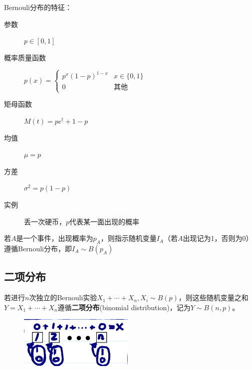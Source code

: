 Bernouli分布的特征：
\begin{description}
    \item[参数] $p \in [0,1]$
    \item[概率质量函数] $p(x)=\begin{cases}
                p^x (1-p)^{1-x} & x \in \{0,1 \} \\
                0               & \text{其他}
            \end{cases}$
    \item[矩母函数] $M(t)=p e^t + 1-p$
    \item[均值] $\mu=p$
    \item[方差] $\sigma^2=p(1-p)$
    \item[实例] 丢一次硬币，$p$代表某一面出现的概率
\end{description}

\begin{remark}
    若$A$是一个事件，出现概率为$p_A$，则指示随机变量$I_A$（若$A$出现记为1，否则为0）遵循Bernouli分布，即$I_A \sim B(p_A)$
\end{remark}

\subsection{二项分布}

\begin{definition}[二项分布]
    若进行$n$次独立的Bernouli实验$X_1+\cdots+X_n, X_i \sim B(p)$，则这些随机变量之和$Y=X_1+\cdots+X_n$遵循\textbf{二项分布}(binomial distribution)，记为$Y \sim B(n,p)$。
\end{definition}

\begin{figure}[h]
    \centering
    \includegraphics{image/binomail_dist.png}
\end{figure}

